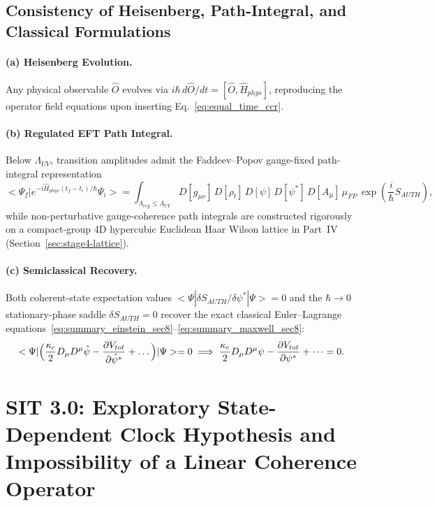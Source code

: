 \documentclass[american,11pt,letterpaper]{article}
\newcommand{\bra}[1]{\langle #1 \rvert}
\newcommand{\ket}[1]{\lvert #1 \rangle}
\newcommand{\braket}[2]{\langle #1 \mid #2 \rangle}
\def\mathcal#1{#1}%
\def\mathrm#1{#1}%
\def\bra#1{<#1|}%
\def\ket#1{|#1>}%
\def\braket#1#2{<#1|#2>}%
\begin{document}
\subsection{Consistency of Heisenberg, Path-Integral, and Classical Formulations}

\paragraph{(a) Heisenberg Evolution.} Any physical observable $\hat{O}$ evolves via $i\hbar\,d\hat{O}/dt = [\hat{O}, \hat{H}_{\mathrm{phys}}]$, reproducing the operator field equations upon inserting Eq.~\eqref{eq:equal_time_ccr}.

\paragraph{(b) Regulated EFT Path Integral.} Below $\Lambda_{\mathrm{UV}}$, transition amplitudes admit the Faddeev--Popov gauge-fixed path-integral representation
\begin{equation}
\braket{\Psi_f}{e^{-i\hat{H}_{\mathrm{phys}}(t_f-t_i)/\hbar}\Psi_i}
= \int_{\Lambda_{\mathrm{reg}} \le \Lambda_{\mathrm{UV}}} \mathcal{D}[g_{\mu\nu}]\,\mathcal{D}[\rho_t]\,\mathcal{D}[\psi]\,\mathcal{D}[\psi^*]\,\mathcal{D}[A_\mu]\,\mu_{\mathrm{FP}}\,
  \exp\!\left(\frac{i}{\hbar}S_{\mathrm{AUTH}}\right),
\label{eq:eft_path_integral}
\end{equation}
while non-perturbative gauge-coherence path integrals are constructed rigorously on a compact-group 4D hypercubic Euclidean Haar Wilson lattice in Part~IV (Section~\ref{sec:stage4-lattice}).

\paragraph{(c) Semiclassical Recovery.} Both coherent-state expectation values $\bra{\Psi}\delta S_{\mathrm{AUTH}}/\delta\psi^*\ket{\Psi} = 0$ and the $\hbar \to 0$ stationary-phase saddle $\delta S_{\mathrm{AUTH}} = 0$ recover the exact classical Euler--Lagrange equations~\eqref{eq:summary_einstein_sec8}--\eqref{eq:summary_maxwell_sec8}:
\[
\bra{\Psi}\Bigl(\frac{\kappa_c}{2} D_\mu D^\mu\hat{\psi} - \frac{\partial V_{\mathrm{tot}}}{\partial\hat{\psi}^*} + \dots\Bigr)\ket{\Psi} = 0
\;\Longrightarrow\;
\frac{\kappa_c}{2} D_\mu D^\mu\psi - \frac{\partial V_{\mathrm{tot}}}{\partial\psi^*} + \dots = 0.
\]

\section{SIT 3.0: Exploratory State-Dependent Clock Hypothesis and Impossibility of a Linear Coherence Operator}
\label{sec:SIT3}
\label{sec:QIP}
\end{document}
